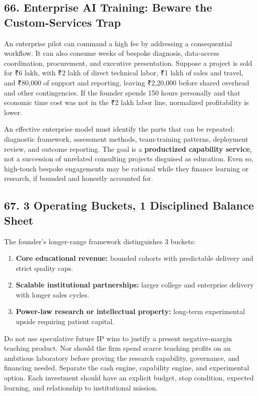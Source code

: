 \subsection*{66. Enterprise AI Training: Beware the Custom-Services Trap}

An enterprise pilot can command a high fee by addressing a consequential workflow. It can also consume weeks of bespoke diagnosis, data-access coordination, procurement, and executive presentation. Suppose a project is sold for ₹6 lakh, with ₹2 lakh of direct technical labor, ₹1 lakh of sales and travel, and ₹80,000 of support and reporting, leaving ₹2,20,000 before shared overhead and other contingencies. If the founder spends 150 hours personally and that economic time cost was not in the ₹2 lakh labor line, normalized profitability is lower.

An effective enterprise model must identify the parts that can be repeated: diagnostic framework, assessment methods, team-training patterns, deployment review, and outcome reporting. The goal is a \textbf{productized capability service}, not a succession of unrelated consulting projects disguised as education. Even so, high-touch bespoke engagements may be rational while they finance learning or research, if bounded and honestly accounted for.

\subsection*{67. 3 Operating Buckets, 1 Disciplined Balance Sheet}

The founder's longer-range framework distinguishes 3 buckets:
\begin{enumerate}
  \item \textbf{Core educational revenue:} bounded cohorts with predictable delivery and strict quality caps.
  \item \textbf{Scalable institutional partnerships:} larger college and enterprise delivery with longer sales cycles.
  \item \textbf{Power-law research or intellectual property:} long-term experimental upside requiring patient capital.
\end{enumerate}

Do not use speculative future IP wins to justify a present negative-margin teaching product. Nor should the firm spend scarce teaching profits on an ambitious laboratory before proving the research capability, governance, and financing needed. Separate the cash engine, capability engine, and experimental option. Each investment should have an explicit budget, stop condition, expected learning, and relationship to institutional mission.

